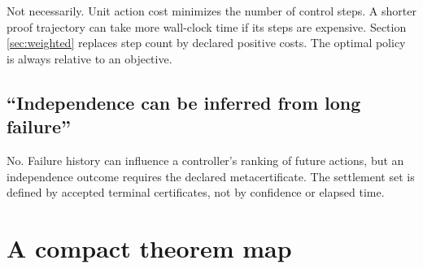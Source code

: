 \documentclass[11pt,letterpaper]{article}
\theoremstyle{remark}
\begin{document}
Not necessarily. Unit action cost minimizes the number of control steps. A shorter proof trajectory can take more wall-clock time if its steps are expensive. Section \ref{sec:weighted} replaces step count by declared positive costs. The optimal policy is always relative to an objective.

\subsection{``Independence can be inferred from long failure''}

No. Failure history can influence a controller's ranking of future actions, but an independence outcome requires the declared metacertificate. The settlement set is defined by accepted terminal certificates, not by confidence or elapsed time.

\section{A compact theorem map}\label{sec:map}
\end{document}

